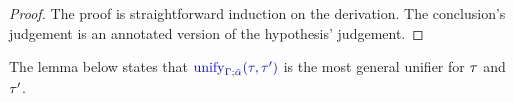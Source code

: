 \begin{proof}
  The proof is straightforward induction on the derivation. The conclusion's judgement
  is an annotated version of the hypothesis' judgement.
\end{proof}

The lemma below states that ${\color{blue} \mathrm{unify}_{\Gamma;\bar{\alpha}}(\tau,\tau')}$ is the most general unifier for $\tau$ and $\tau'$.

{\centering
{}}

